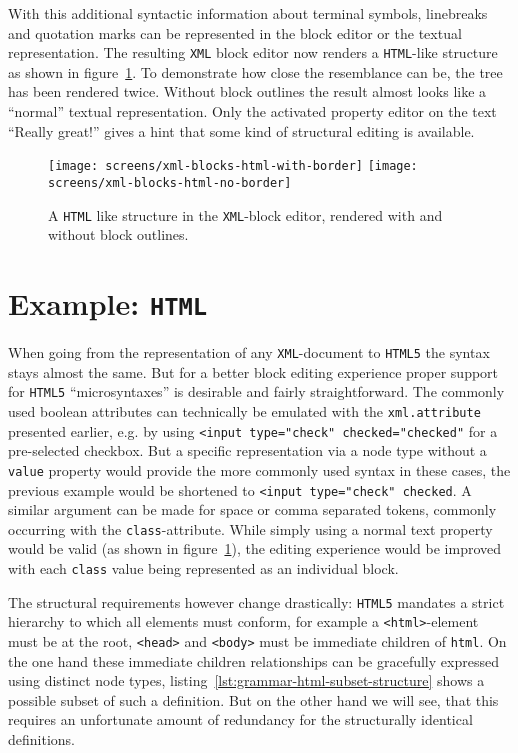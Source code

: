 \documentclass[sigconf,natbib=false,review=true,anonymous]{acmart}
\begin{document}
With this additional syntactic information about terminal symbols, linebreaks and quotation marks can be represented in the block editor or the textual representation. The resulting \texttt{XML} block editor now renders a \texttt{HTML}-like structure as shown in figure~\ref{fig:screen-editor-xml-no-border}. To demonstrate how close the resemblance can be, the tree has been rendered twice. Without block outlines the result almost looks like a \enquote{normal} textual representation. Only the activated property editor on the text \enquote{Really great!} gives a hint that some kind of structural editing is available.

\begin{figure}
  \texttt{[image: screens/xml-blocks-html-with-border]}
  \texttt{[image: screens/xml-blocks-html-no-border]}
  \caption{A \texttt{HTML} like structure in the \texttt{XML}-block editor, rendered with and without block outlines.}
  \label{fig:screen-editor-xml-no-border}
\end{figure}

\section{Example: \texttt{HTML}}

When going from the representation of any \texttt{XML}-document to \texttt{HTML5} the syntax stays almost the same. But for a better block editing experience proper support for \texttt{HTML5} \enquote{microsyntaxes} is desirable and fairly straightforward. The commonly used boolean attributes can technically be emulated with the \texttt{xml.attribute} presented earlier, e.g. by using \texttt{<input type="check" checked="checked"} for a pre-selected checkbox. But a specific representation via a node type without a \texttt{value} property would provide the more commonly used syntax in these cases, the previous example would be shortened to \texttt{<input type="check" checked}. A similar argument can be made for space or comma separated tokens, commonly occurring with the \texttt{class}-attribute. While simply using a normal text property would be valid (as shown in figure~\ref{fig:screen-editor-xml-no-border}), the editing experience would be improved with each \texttt{class} value being represented as an individual block.

The structural requirements however change drastically: \texttt{HTML5} mandates a strict hierarchy to which all elements must conform, for example a \texttt{<html>}-element must be at the root, \texttt{<head>} and \texttt{<body>} must be immediate children of \texttt{html}. On the one hand these immediate children relationships can be gracefully expressed using distinct node types, listing~\ref{lst:grammar-html-subset-structure} shows a possible subset of such a definition. But on the other hand we will see, that this requires an unfortunate amount of redundancy for the structurally identical definitions.
\end{document}
